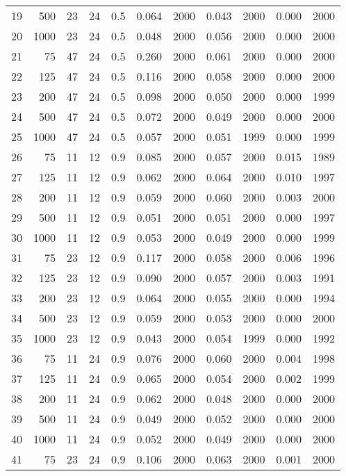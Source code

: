 \documentclass{article}
\begin{document}
\begin{tabular}{rrrrrrrrrrr}
  19 & 500 & 23 & 24 & 0.5 & 0.064 & 2000 & 0.043 & 2000 & 0.000 & 2000 \\ 
  20 & 1000 & 23 & 24 & 0.5 & 0.048 & 2000 & 0.056 & 2000 & 0.000 & 2000 \\ 
   \hline
21 & 75 & 47 & 24 & 0.5 & 0.260 & 2000 & 0.061 & 2000 & 0.000 & 2000 \\ 
  22 & 125 & 47 & 24 & 0.5 & 0.116 & 2000 & 0.058 & 2000 & 0.000 & 2000 \\ 
  23 & 200 & 47 & 24 & 0.5 & 0.098 & 2000 & 0.050 & 2000 & 0.000 & 1999 \\ 
  24 & 500 & 47 & 24 & 0.5 & 0.072 & 2000 & 0.049 & 2000 & 0.000 & 2000 \\ 
  25 & 1000 & 47 & 24 & 0.5 & 0.057 & 2000 & 0.051 & 1999 & 0.000 & 1999 \\ 
   \hline
26 & 75 & 11 & 12 & 0.9 & 0.085 & 2000 & 0.057 & 2000 & 0.015 & 1989 \\ 
  27 & 125 & 11 & 12 & 0.9 & 0.062 & 2000 & 0.064 & 2000 & 0.010 & 1997 \\ 
  28 & 200 & 11 & 12 & 0.9 & 0.059 & 2000 & 0.060 & 2000 & 0.003 & 2000 \\ 
  29 & 500 & 11 & 12 & 0.9 & 0.051 & 2000 & 0.051 & 2000 & 0.000 & 1997 \\ 
  30 & 1000 & 11 & 12 & 0.9 & 0.053 & 2000 & 0.049 & 2000 & 0.000 & 1999 \\ 
   \hline
31 & 75 & 23 & 12 & 0.9 & 0.117 & 2000 & 0.058 & 2000 & 0.006 & 1996 \\ 
  32 & 125 & 23 & 12 & 0.9 & 0.090 & 2000 & 0.057 & 2000 & 0.003 & 1991 \\ 
  33 & 200 & 23 & 12 & 0.9 & 0.064 & 2000 & 0.055 & 2000 & 0.000 & 1994 \\ 
  34 & 500 & 23 & 12 & 0.9 & 0.059 & 2000 & 0.053 & 2000 & 0.000 & 2000 \\ 
  35 & 1000 & 23 & 12 & 0.9 & 0.043 & 2000 & 0.054 & 1999 & 0.000 & 1992 \\ 
   \hline
36 & 75 & 11 & 24 & 0.9 & 0.076 & 2000 & 0.060 & 2000 & 0.004 & 1998 \\ 
  37 & 125 & 11 & 24 & 0.9 & 0.065 & 2000 & 0.054 & 2000 & 0.002 & 1999 \\ 
  38 & 200 & 11 & 24 & 0.9 & 0.062 & 2000 & 0.048 & 2000 & 0.000 & 2000 \\ 
  39 & 500 & 11 & 24 & 0.9 & 0.049 & 2000 & 0.052 & 2000 & 0.000 & 2000 \\ 
  40 & 1000 & 11 & 24 & 0.9 & 0.052 & 2000 & 0.049 & 2000 & 0.000 & 2000 \\ 
   \hline
41 & 75 & 23 & 24 & 0.9 & 0.106 & 2000 & 0.063 & 2000 & 0.001 & 2000 \\ 

\end{tabular}
\end{document}
